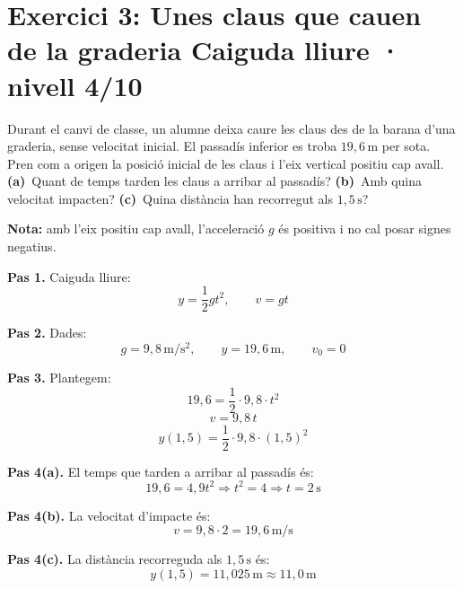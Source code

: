 \documentclass[11pt,a4paper]{article}
\begin{document}
\clearpage

\section*{Exercici 3: Unes claus que cauen de la graderia \hfill \normalfont Caiguda lliure · nivell 4/10}

Durant el canvi de classe, un alumne deixa caure les claus des de la barana d'una graderia, sense velocitat inicial. El passadís inferior es troba $19{,}6\,\mathrm{m}$ per sota. Pren com a origen la posició inicial de les claus i l'eix vertical positiu cap avall. \textbf{(a)}~Quant de temps tarden les claus a arribar al passadís? \textbf{(b)}~Amb quina velocitat impacten? \textbf{(c)}~Quina distància han recorregut als $1{,}5\,\mathrm{s}$?

\begin{center}
\end{center}

\textbf{Nota:} amb l'eix positiu cap avall, l'acceleració $g$ és positiva i no cal posar signes negatius.

\begin{solutionbox}
\textbf{Pas 1.} Caiguda lliure:
\[
y=\frac{1}{2}gt^2, \qquad v=gt
\]

\textbf{Pas 2.} Dades:
\[
g=9{,}8\,\mathrm{m/s^2}, \qquad y=19{,}6\,\mathrm{m}, \qquad v_0=0
\]

\textbf{Pas 3.} Plantegem:
\[
19{,}6=\frac{1}{2}\cdot 9{,}8\cdot t^2
\]
\[
v=9{,}8\,t
\]
\[
y(1{,}5)=\frac{1}{2}\cdot 9{,}8\cdot (1{,}5)^2
\]

\textbf{Pas 4(a).} El temps que tarden a arribar al passadís és:
\[
19{,}6=4{,}9t^2 \Longrightarrow t^2=4 \Longrightarrow t=2\,\mathrm{s}
\]

\textbf{Pas 4(b).} La velocitat d'impacte és:
\[
v=9{,}8\cdot 2=19{,}6\,\mathrm{m/s}
\]

\textbf{Pas 4(c).} La distància recorreguda als $1{,}5\,\mathrm{s}$ és:
\[
y(1{,}5)=11{,}025\,\mathrm{m}\approx 11{,}0\,\mathrm{m}
\]
\end{solutionbox}
\end{document}
